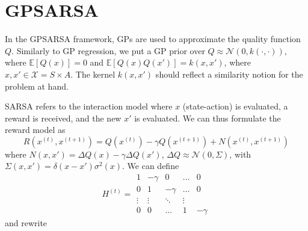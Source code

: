 \documentclass[10pt, twocolumn, twoside]{article}
\begin{document}
\section{GPSARSA}
In the GPSARSA framework, GPs are used to approximate the quality function $Q$. Similarly to GP regression,
we put a GP prior over $Q \approx \mathcal{N}(0, k(\cdot, \cdot))$, where $\mathbb{E}[Q(x)] = 0$ and
$\mathbb{E}[Q(x)Q(x')] = k(x, x')$, where $x, x' \in \mathcal{X} = S \times A$. The kernel $k(x, x')$
should reflect a similarity notion for the problem at hand.

SARSA refers to the interaction model where $x$ (state-action) is evaluated, a reward is received,
and the new $x'$ is evaluated. We can thus formulate the reward model as
\begin{equation}
R(x^{(t)}, x^{(t+1)}) = Q(x^{(t)}) - \gamma Q(x^{(t+1)}) + N(x^{(t)}, x^{(t+1)})
\end{equation}
where $N(x, x') = \Delta Q(x) - \gamma \Delta Q(x')$, $\Delta Q \approx \mathcal{N}(0,\Sigma)$,
with $\Sigma(x, x') = \delta(x - x')\sigma^2(x)$. We can define
$$H^{(t)} =
\begin{matrix}
1 & -\gamma & 0 & \ldots & 0 \\
0 & 1 & -\gamma & \ldots & 0 \\
\vdots & \vdots & \ddots & \vdots \\
0 & 0 & \ldots & 1 & -\gamma
\end{matrix}$$ and rewrite 
\end{document}
